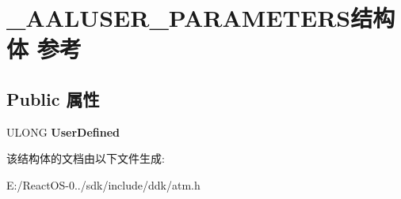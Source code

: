 \hypertarget{struct___a_a_l_u_s_e_r___p_a_r_a_m_e_t_e_r_s}{}\section{\+\_\+\+A\+A\+L\+U\+S\+E\+R\+\_\+\+P\+A\+R\+A\+M\+E\+T\+E\+R\+S结构体 参考}
\label{struct___a_a_l_u_s_e_r___p_a_r_a_m_e_t_e_r_s}
\subsection*{Public 属性}
\begin{DoxyCompactItemize}
\item 
\mbox{\label{struct___a_a_l_u_s_e_r___p_a_r_a_m_e_t_e_r_s_a549ca47cab8f229a95c02ac58ffb4ba1}} 
U\+L\+O\+NG {\bfseries User\+Defined}
\end{DoxyCompactItemize}


该结构体的文档由以下文件生成\+:\begin{DoxyCompactItemize}
\item 
E\+:/\+React\+O\+S-\/0../sdk/include/ddk/atm.\+h\end{DoxyCompactItemize}
